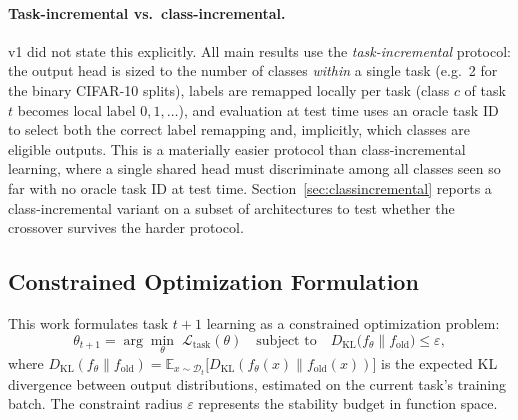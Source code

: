 \documentclass[11pt]{article}
\newcommand{\E}{\mathbb{E}}
\newcommand{\eps}{\varepsilon}
\newcommand{\DKL}{D_{\mathrm{KL}}}
\begin{document}
\paragraph{Task-incremental vs.\ class-incremental.} v1 did not state this
explicitly. All main results use the \emph{task-incremental} protocol: the
output head is sized to the number of classes \emph{within} a single task
(e.g.\ 2 for the binary CIFAR-10 splits), labels are remapped locally per
task (class $c$ of task $t$ becomes local label $0,1,\ldots$), and
evaluation at test time uses an oracle task ID to select both the correct
label remapping and, implicitly, which classes are eligible outputs. This is
a materially easier protocol than class-incremental learning, where a single
shared head must discriminate among all classes seen so far with no oracle
task ID at test time. Section~\ref{sec:classincremental} reports a
class-incremental variant on a subset of architectures to test whether the
crossover survives the harder protocol.

\subsection{Constrained Optimization Formulation}
This work formulates task $t+1$ learning as a constrained optimization problem:
\begin{equation}
\theta_{t+1} = \arg\min_\theta \; \mathcal{L}_{\mathrm{task}}(\theta)
\quad \text{subject to} \quad \DKL\big(f_\theta \| f_{\mathrm{old}}\big) \le \eps,
\label{eq:constrained}
\end{equation}
where $\DKL(f_\theta \| f_{\mathrm{old}}) = \E_{x \sim \mathcal{D}_t}\big[\DKL(f_\theta(x) \| f_{\mathrm{old}}(x))\big]$
is the expected KL divergence between output distributions, estimated on the
current task's training batch. The constraint radius $\eps$ represents the
stability budget in function space.
\end{document}
